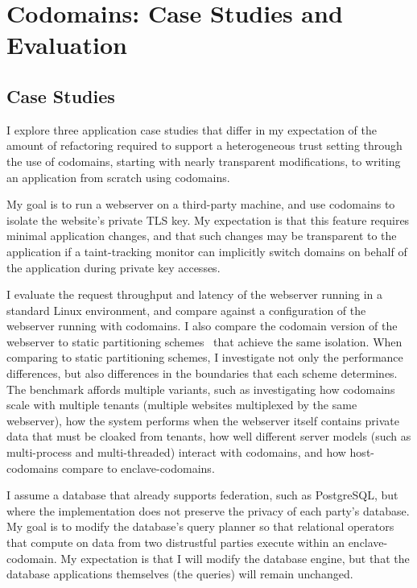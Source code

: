 \section{Codomains: Case Studies and Evaluation}
\label{sec:codomains-eval}

\subsection{Case Studies}

I explore three application case studies that differ in my expectation of the
amount of refactoring required to support a heterogeneous trust setting through
the use of codomains, starting with nearly transparent modifications, to
writing an application from scratch using codomains.


%
My goal is to run a webserver on a third-party machine, and use codomains to
isolate the website's private TLS key.
%
My expectation is that this feature requires minimal application changes,
and that such changes may be transparent to the application if a taint-tracking
monitor can implicitly switch domains on behalf of the application during
private key accesses.


I evaluate the request throughput and latency of the webserver running in a
standard Linux environment, and compare against a configuration of the
webserver running with codomains.
%
I also compare the codomain version of the webserver to 
static partitioning schemes~\cite{eleos,glamdring,privtrans} that achieve
the same isolation.
%
When comparing to static partitioning schemes, I investigate not only the
performance differences, but also differences in the boundaries that
each scheme determines.
%
The benchmark affords multiple variants, such as investigating how codomains
scale with multiple tenants (multiple websites multiplexed by the same
webserver), how the system performs when the webserver itself contains private
data that must be cloaked from tenants, how well different server models (such
as multi-process and multi-threaded) interact with codomains, and how
host-codomains compare to enclave-codomains.


%
I assume a database that already supports federation, such as PostgreSQL,
but where the implementation does not preserve the privacy of each party's
database.
%
My goal is to modify the database's query planner so that relational operators
that compute on  data from two distrustful parties execute within an
enclave-codomain.
%
My expectation is that I will modify the database engine, but that the
database applications themselves (the queries) will remain unchanged.


